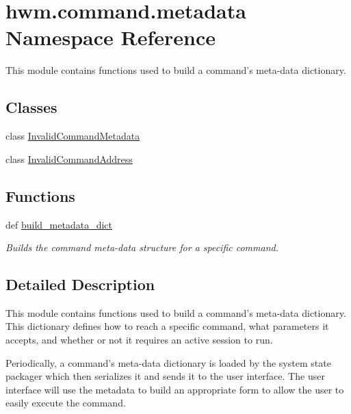 \hypertarget{namespacehwm_1_1command_1_1metadata}{\section{hwm.\-command.\-metadata Namespace Reference}
\label{namespacehwm_1_1command_1_1metadata}
}


This module contains functions used to build a command's meta-\/data dictionary.  


\subsection*{Classes}
\begin{DoxyCompactItemize}
\item 
class \hyperlink{classhwm_1_1command_1_1metadata_1_1_invalid_command_metadata}{Invalid\-Command\-Metadata}
\item 
class \hyperlink{classhwm_1_1command_1_1metadata_1_1_invalid_command_address}{Invalid\-Command\-Address}
\end{DoxyCompactItemize}
\subsection*{Functions}
\begin{DoxyCompactItemize}
\item 
def \hyperlink{namespacehwm_1_1command_1_1metadata_a7cef22ff8d0a900651eaf7725022e4ff}{build\-\_\-metadata\-\_\-dict}
\begin{DoxyCompactList}\small\item\em Builds the command meta-\/data structure for a specific command. \end{DoxyCompactList}\end{DoxyCompactItemize}


\subsection{Detailed Description}
This module contains functions used to build a command's meta-\/data dictionary. This dictionary defines how to reach a specific command, what parameters it accepts, and whether or not it requires an active session to run.

Periodically, a command's meta-\/data dictionary is loaded by the system state packager which then serializes it and sends it to the user interface. The user interface will use the metadata to build an appropriate form to allow the user to easily execute the command. 

